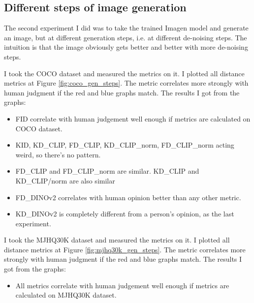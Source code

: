 \subsection{Different steps of image generation}
The second experiment I did was to take the trained Imagen model and generate an image, but at different generation steps, i.e. at different de-noising steps. The intuition is that the image obviously gets better and better with more de-noising steps.

I took the COCO dataset and measured the metrics on it. I plotted all distance metrics at Figure \ref{fig:coco_gen_steps}. The metric correlates more strongly with human judgment if the red and blue graphs match.
The results I got from the graphs:
\begin{itemize}
    \item FID correlate with human judgement well enough if metrics are calculated on COCO dataset.
    \item KID, KD\_CLIP, FD\_CLIP, KD\_CLIP\_norm, FD\_CLIP\_norm acting weird, so there's no pattern.
    \item FD\_CLIP and FD\_CLIP\_norm are similar. KD\_CLIP and KD\_CLIP/norm are also similar
    \item FD\_DINOv2 correlates with human opinion better than any other metric.
    \item KD\_DINOv2 is completely different from a person's opinion, as the last experiment.
\end{itemize}

I took the MJHQ30K dataset and measured the metrics on it. I plotted all distance metrics at Figure \ref{fig:mjhq30k_gen_steps}. The metric correlates more strongly with human judgment if the red and blue graphs match.
The results I got from the graphs:
\begin{itemize}
    \item All metrics correlate with human judgement well enough if metrics are calculated on MJHQ30K dataset.
\end{itemize}

